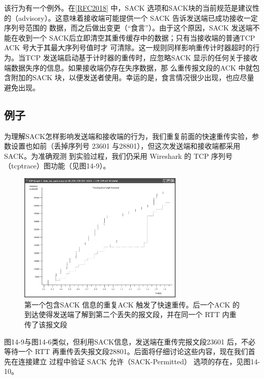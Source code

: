 该行为有一个例外。在\href{https://www.rfc-editor.org/rfc/rfc2018}{[RFC2018]}
中，SACK 选项和SACK块的当前规范是建议性的（advisory）。这意味着接收端可能提供一个 SACK 告诉发送端已成功接收一定序列号范围的
数据，而之后做出变更（“食言”）。由于这个原因，SACK 发送端不能在收到一个
SACK后立即清空其重传缓存中的数据；只有当接收端的普通TCP ACK 号大于其最大序列号值时才
可清除。这一规则同样影响重传计时器超时的行为。当TCP 发送端启动基于计时器的重传时，应忽略SACK
显示的任何关于接收端数据失序的信息。如果接收端仍存在失序数据，那
么重传报文段的ACK 中就包含附加的SACK 块，以便发送者使用。幸运的是，食言情况很少出现，也应尽量避免出现。

\subsection{例子}
为理解SACK怎样影响发送端和接收端的行为，我们重复前面的快速重传实验，参数设置也如前（丢掉序列号 23601
与28801），但这次发送端和接收端都采用SACK。为准确观测
到实验过程，我们仍采用 Wireshark 的 TCP 序列号（tcptrace）图功能（见图14-9）。
\begin{figure}[!htb]
\centering
\includegraphics[width=0.7\textwidth]{imgs/14/14-9.png}
\caption{第一个包含SACK 信息的重复ACK 触发了快速重传。后一个ACK 的到达使得发送端了解到第二个丢失的报文段，并在同一个
RTT 内重传了该报文段}
\end{figure}

图14-9与图14-6类似，但利用SACK信息，发送端在重传完报文段23601 后，不必等待一个 RTT
再重传丢失报文段28801。后面将仔细讨论这些内容，现在我们首先在连接建立
过程中验证 SACK 允许（SACK-Permitted） 选项的存在，见图14-10。

